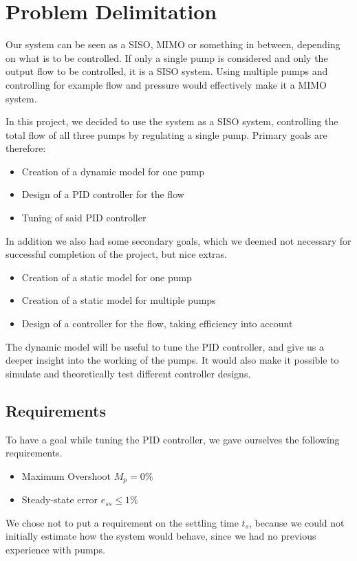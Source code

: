 \section{Problem Delimitation}
Our system can be seen as a SISO, MIMO or something in between,
depending on what is to be controlled.
If only a single pump is considered and only the output flow to be controlled,
it is a SISO system.
Using multiple pumps and controlling for example flow and pressure would effectively make it a MIMO system.

In this project,
we decided to use the system as a SISO system,
controlling the total flow of all three pumps by regulating a single pump.
Primary goals are therefore:

\begin{itemize}
\item Creation of a dynamic model for one pump
\item Design of a PID controller for the flow
\item Tuning of said PID controller 
\end{itemize}

In addition we also had some secondary goals,
which we deemed not necessary for successful completion of the project,
but nice extras.

\begin{itemize}
\item Creation of a static model for one pump
\item Creation of a static model for multiple pumps
\item Design of a controller for the flow, taking efficiency into account
\end{itemize}

The dynamic model will be useful to tune the PID controller,
and give us a deeper insight into the working of the pumps.
It would also make it possible to simulate and theoretically test different controller designs.


\subsection{Requirements}\label{sub:req}
To have a goal while tuning the PID controller,
we gave ourselves the following requirements.

\begin{itemize}
\item Maximum Overshoot $M_p = 0\%$
\item Steady-state error $e_{ss} \leq 1 \%$
\end{itemize}

We chose not to put a requirement on the settling time $t_s$,
because we could not initially estimate how the system would behave,
since we had no previous experience with pumps.